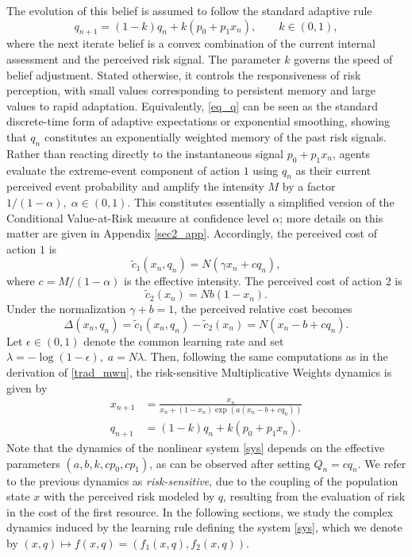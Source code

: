 \documentclass{article}
\theoremstyle{plain}
\theoremstyle{definition}
\begin{document}
The evolution of this belief is assumed to follow the standard adaptive rule
\begin{equation}
q_{n+1}=(1-k)q_n+k(p_0+p_1x_n),
\qquad k\in(0,1),
\label{eq_q}
\end{equation}
where the next iterate belief is a convex combination of the current internal assessment and the perceived risk signal. The parameter \(k\) governs the speed of belief adjustment. Stated otherwise, it controls the responsiveness of risk perception, with small values corresponding to persistent memory and large values to rapid adaptation. Equivalently, \eqref{eq_q} can be seen as the standard discrete-time form of adaptive expectations or exponential smoothing, showing that $q_n$ constitutes an exponentially weighted memory of the past risk signals. Rather than reacting directly to the instantaneous signal $p_0+p_1x_n$, agents evaluate the extreme-event component of action $1$ using $q_n$ as their current perceived event probability and amplify the intensity $M$ by a factor $1/(1-\alpha),\; \alpha \in (0,1)$. This constitutes essentially a simplified version of the Conditional Value-at-Risk measure at confidence level $\alpha$; more details on this matter are given in Appendix \ref{sec2_app}. Accordingly, the perceived cost of action \(1\) is
\begin{equation}
\tilde c_1(x_n,q_n)
=
N\left(\gamma x_n+cq_n\right),
\label{eq:c1tilde}
\end{equation}
where $c=M/(1-\alpha)$ is the effective intensity. The perceived cost of action \(2\) is
\begin{equation}
\tilde c_2(x_n)=Nb(1-x_n).
\label{eq_c1}
\end{equation}
Under the normalization \(\gamma+b=1\), the perceived relative cost becomes
\begin{equation}
\Delta(x_n,q_n)=\tilde c_1(x_n,q_n)-\tilde c_2(x_n)
=
N\left(x_n-b+c q_n\right).
\label{eq_c2}
\end{equation}
Let \(\epsilon\in(0,1)\) denote the common learning rate and set $\lambda=-\log(1-\epsilon), \; a=N\lambda$. Then, following the same computations as in the derivation of \eqref{trad_mwu}, the risk-sensitive Multiplicative Weights dynamics is given by 
\begin{align}
x_{n+1}&=\frac{x_n}{x_n+(1-x_n)\exp\!\left(
a\left(x_n-b+cq_n \right)
\right)} \nonumber\\
q_{n+1}&=(1-k)q_n+k(p_0+p_1x_n).
\label{sys}
\end{align}
Note that the dynamics of the nonlinear system \eqref{sys} depends on the effective parameters $(a,b,k,cp_0,cp_1)$, as can be observed after setting $Q_n=cq_n.$ We refer to the previous dynamics as \emph{risk-sensitive}, due to the coupling of the population state $x$ with the perceived risk modeled by $q$, resulting from the evaluation of risk in the cost of the first resource. In the following sections, we study the complex dynamics induced by the learning rule defining the system \eqref{sys}, which we denote by $(x,q)\mapsto f(x,q)=(f_1(x,q),f_2(x,q)).$ 
\end{document}
